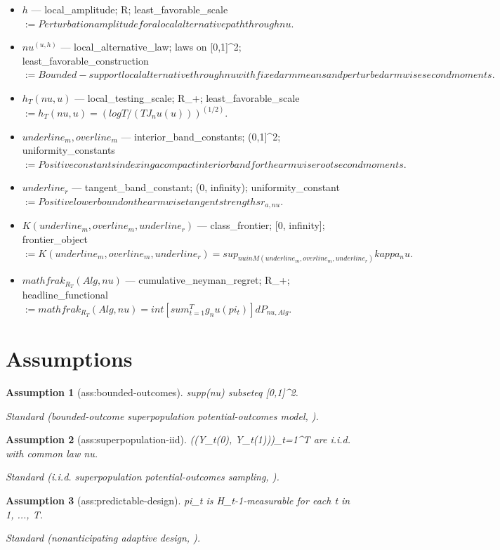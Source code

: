 \documentclass{article}
\newtheorem{assumption}{Assumption}
\begin{document}
\begin{itemize}
  \item $h$ --- local_amplitude; R; least_favorable_scale $:= Perturbation amplitude for a local alternative path through nu.$
  \item $nu^(u,h)$ --- local_alternative_law; laws on [0,1]^2; least_favorable_construction $:= Bounded-support local alternative through nu with fixed arm means and perturbed armwise second moments.$
  \item $h_T(nu,u)$ --- local_testing_scale; R_+; least_favorable_scale $:= h_T(nu,u) = (log T / (T J_nu(u)))^(1/2).$
  \item $underline_m, overline_m$ --- interior_band_constants; (0,1]^2; uniformity_constants $:= Positive constants indexing a compact interior band for the armwise root second moments.$
  \item $underline_r$ --- tangent_band_constant; (0, infinity); uniformity_constant $:= Positive lower bound on the armwise tangent strengths r_{a,nu}.$
  \item $K(underline_m, overline_m, underline_r)$ --- class_frontier; [0, infinity]; frontier_object $:= K(underline_m, overline_m, underline_r) = sup_{nu in M(underline_m, overline_m, underline_r)} kappa_nu.$
  \item $mathfrak_R_T(Alg,nu)$ --- cumulative_neyman_regret; R_+; headline_functional $:= mathfrak_R_T(Alg,nu) = int [sum_{t=1}^T g_nu(pi_t)] d P_{nu,Alg}.$
\end{itemize}

\section{Assumptions}

\begin{assumption}[ass:bounded-outcomes]\label{ass:bounded-outcomes}
supp(nu) subseteq [0,1]^2.
\par\smallskip\noindent\emph{Standard} (bounded-outcome superpopulation potential-outcomes model, \cite{neopane2024logarithmic}).
\end{assumption}

\begin{assumption}[ass:superpopulation-iid]\label{ass:superpopulation-iid}
((Y_t(0), Y_t(1)))_{t=1}^T are i.i.d. with common law nu.
\par\smallskip\noindent\emph{Standard} (i.i.d. superpopulation potential-outcomes sampling, \cite{neopane2024logarithmic}).
\end{assumption}

\begin{assumption}[ass:predictable-design]\label{ass:predictable-design}
pi_t is H_{t-1}-measurable for each t in {1, ..., T}.
\par\smallskip\noindent\emph{Standard} (nonanticipating adaptive design, \cite{dai2023clipogd}).
\end{assumption}
\end{document}
